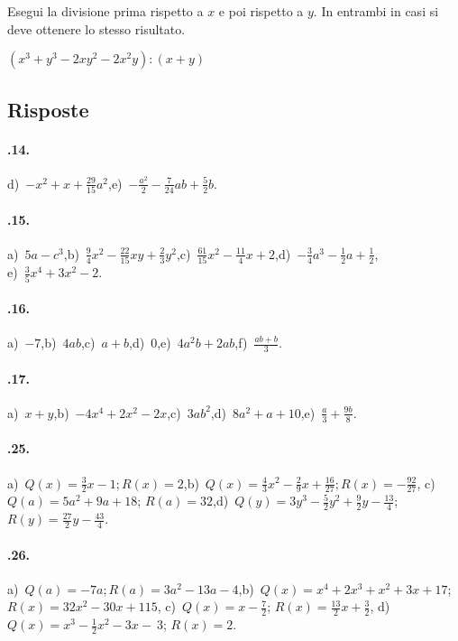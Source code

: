 \begin{esercizio}[\Ast]
\label{ese:11.65}
Esegui la divisione prima rispetto a $x$ e poi rispetto a $y$. In entrambi in casi si deve ottenere lo stesso risultato.

$\left(x^{3}+y^{3}-2xy^{2}-2x^{2}y\right):(x+y)$
\end{esercizio}

\subsection{Risposte}
\paragraph{\thechapter.14.} d)~$-x^{2}+x+\frac{29}{15}a^{2}$,\quad e)~$-{\frac{a^{2}}{2}}-\frac{7}{24}ab+\frac{5}{2}b$.
\paragraph{\thechapter.15.} a)~$5a-c^{3}$,\quad b)~$\frac{9}{4}x^{2}-\frac{22}{15}xy+\frac{2}{3}y^{2}$,\quad c)~$\frac{61}{15}x^{2}-\frac{11}{4}x+2$,\quad d)~$-\frac{3}{4}a^{3}-\frac{1}{2}a+\frac{1}{2}$,\protect\\ e)~$\frac{3}{5}x^{4}+3x^{2}-2$.
\paragraph{\thechapter.16.} a)~$-7$,\quad b)~$4ab$,\quad c)~$a+b$,\quad d)~$0$,\quad e)~$4a^{2}b+2ab$,\quad f)~$\frac{ab+b}{3}$.
\paragraph{\thechapter.17.} a)~$x+y$,\quad b)~$-4x^{4}+2x^{2}-2x$,\quad c)~$3ab^{2}$,\quad d)~$8a^{2}+a+10$,\quad e)~$\frac{a}{3}+\frac{9b}{8}$.
\paragraph{\thechapter.25.}
a)~$Q(x)=\frac{3}{2}x-1; R(x)=2$,\quad b)~$Q(x)=\frac{4}{3}x^{2}-\frac{2}{9}x+\frac{16}{27}; R(x)=-{\frac{92}{27}}$,\quad
c)~{$Q(a)=5a^{2}+9a+18$}; $R(a)=32$,\quad d)~$Q(y)=3y^{3}-\frac{5}{2}y^{2}+\frac{9}{2}y-\frac{13}{4}$; $R(y)=\frac{27}{2}y-\frac{43}{4}$.
\paragraph{\thechapter.26.}
a)~$Q(a)=-7a; R(a)=3a^{2}-13a-4$,\quad b)~$Q(x)=x^{4}+2x^{3}+x^{2}+3x+17$;\protect\\ ${R(x)=32x^{2}-30x+115}$,\quad
c)~$Q(x)=x-\frac{7}{2}$; $R(x)=\frac{13}{2}x+\frac{3}{2}$, d)~$Q(x)=x^{3}-\frac{1}{2}x^{2}-3x-~3$; $R(x)=2$.
